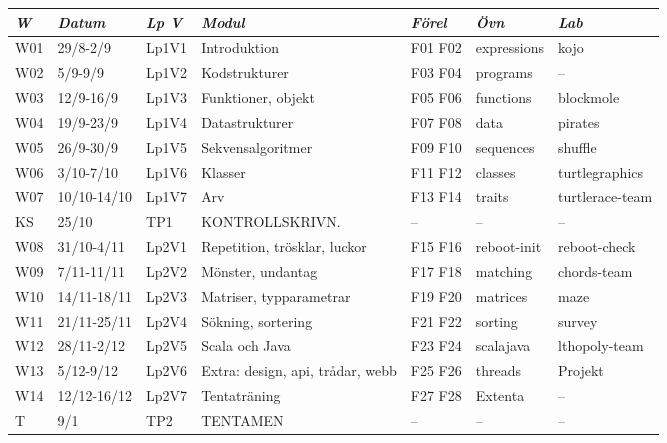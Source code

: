 \begin{tabular}{l|l|l|l|l|l|l}
\textit{W} & \textit{Datum} & \textit{Lp V} & \textit{Modul} & \textit{Förel} & \textit{Övn} & \textit{Lab} \\ \hline \hline
W01 & 29/8-2/9 & Lp1V1 & Introduktion & F01 F02 & expressions & kojo \\
W02 & 5/9-9/9 & Lp1V2 & Kodstrukturer & F03 F04 & programs & -- \\
W03 & 12/9-16/9 & Lp1V3 & Funktioner, objekt & F05 F06 & functions & blockmole \\
W04 & 19/9-23/9 & Lp1V4 & Datastrukturer & F07 F08 & data & pirates \\
W05 & 26/9-30/9 & Lp1V5 & Sekvensalgoritmer & F09 F10 & sequences & shuffle \\
W06 & 3/10-7/10 & Lp1V6 & Klasser & F11 F12 & classes & turtlegraphics \\
W07 & 10/10-14/10 & Lp1V7 & Arv & F13 F14 & traits & turtlerace-team \\
KS & 25/10 & TP1 & KONTROLLSKRIVN. & -- & -- & -- \\
W08 & 31/10-4/11 & Lp2V1 & Repetition, trösklar, luckor & F15 F16 & reboot-init & reboot-check \\
W09 & 7/11-11/11 & Lp2V2 & Mönster, undantag & F17 F18 & matching & chords-team \\
W10 & 14/11-18/11 & Lp2V3 & Matriser, typparametrar & F19 F20 & matrices & maze \\
W11 & 21/11-25/11 & Lp2V4 & Sökning, sortering & F21 F22 & sorting & survey \\
W12 & 28/11-2/12 & Lp2V5 & Scala och Java & F23 F24 & scalajava & lthopoly-team \\
W13 & 5/12-9/12 & Lp2V6 & Extra: design, api, trådar, webb & F25 F26 & threads & Projekt \\
W14 & 12/12-16/12 & Lp2V7 & Tentaträning & F27 F28 & Extenta & -- \\
T & 9/1 & TP2 & TENTAMEN & -- & -- & -- \\
\end{tabular}
